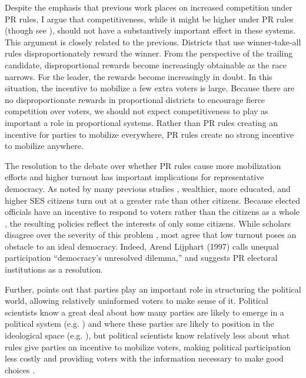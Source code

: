 \documentclass[12pt]{article}
\begin{document}
Despite the emphasis that previous work places on increased competition under PR rules, I argue that competitiveness, while it might be higher under PR rules (though see \citealt{BlaisLago2009}), should not have a substantively important effect in these systems. This argument is closely related to the previous. Districts that use winner-take-all rules disproportionately reward the winner. From the perspective of the trailing candidate, disproportional rewards become increasingly obtainable as the race narrows. For the leader, the rewards become increasingly in doubt. In this situation, the incentive to mobilize a few extra voters is large. Because there are no disproportionate rewards in proportional districts to encourage fierce competition over voters, we should not expect competitiveness to play as important a role in proportional systems. Rather than PR rules creating an incentive for parties to mobilize everywhere, PR rules create no strong incentive to mobilize anywhere.

The resolution to the debate over whether PR rules cause more mobilization efforts and higher turnout has important implications for representative democracy. As noted by many previous studies \citep{WolfingerRosenstone1980, RosenstoneHansen1993, BradyVerbaSchlozman1995}, wealthier, more educated, and higher SES citizens turn out at a greater rate than other citizens. Because elected officials have an incentive to respond to voters rather than the citizens as a whole \citep{Downs1957}, the resulting policies reflect the interests of only some citizens. While scholars disagree over the severity of this problem \citep{BerelsonLazarsfeldMcPhee1954, Lijphart1997, Teixeira1992}, most agree that low turnout poses an obstacle to an ideal democracy. Indeed, Arend Lijphart (1997) calls unequal participation ``democracy's unresolved dilemma,'' and suggests PR electoral institutions as a resolution.

Further, \cite{Sniderman2000} points out that parties play an important role in structuring the political world, allowing relatively uninformed voters to make sense of it. Political scientists know a great deal about how many parties are likely to emerge in a political system (e.g. \citealt{Cox1997, ChhibberKollman1998, ClarkGolder2006}) and where these parties are likely to position in the ideological space (e.g. \citealt{Cox1990, KollmanMillerPage1992, AdamsMerrillGrofman2005}), but political scientists know relatively less about what rules give parties an incentive to mobilize voters, making political participation less costly and providing voters with the information necessary to make good choices \citep{Downs1957}.
\end{document}

